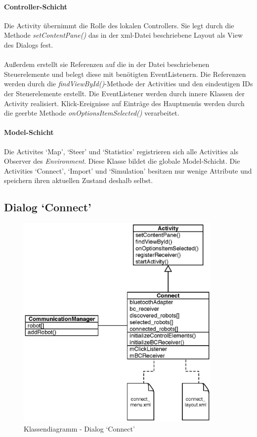 \documentclass[10pt,a4paper]{article}
\begin{document}
	\paragraph*{Controller-Schicht} Die Activity übernimmt die Rolle des lokalen Controllers. Sie legt durch die Methode \textit{setContentPane()}
	das in der xml-Datei beschriebene Layout als View des Dialogs fest. \\ \\ 
	Außerdem erstellt sie Referenzen auf die in der Datei beschriebenen Steuerelemente und belegt diese mit benötigten EventListenern. Die Referenzen
	werden durch die \textit{findViewById()}-Methode der Activities und den eindeutigen IDs der Steuerelemente erstellt. Die EventListener werden
	durch innere Klassen der Activity realisiert. Klick-Ereignisse auf Einträge des Hauptmenüs werden durch die geerbte Methode 
	\textit{onOptionsItemSelected()} verarbeitet.
	
	\paragraph*{Model-Schicht}
	Die Activites `Map', `Steer' und `Statistics' registrieren sich alle Activities als Observer des \textit{Environment}. Diese Klasse bildet die
	globale Model-Schicht. Die Activities `Connect', `Import' und `Simulation' besitzen nur wenige Attribute und speichern ihren aktuellen Zustand
	deshalb selbst.
	
	\subsection*{Dialog `Connect'}
	
	\begin{figure}[h]
			\centering
			\includegraphics[width=10cm]{images/entwurf_connect.eps}
  			\caption{Klassendiagramm - Dialog `Connect'}
  			\label{fig:dialog_connect}
  	\end{figure}
	
\end{document}
